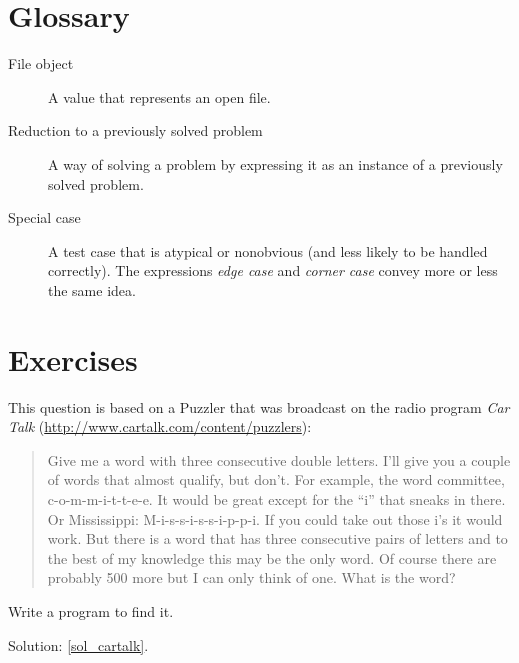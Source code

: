 \section{Glossary}

\begin{description}

\item[File object] A value that represents an open file.

\item[Reduction to a previously solved problem] A way of solving a
  problem by expressing it as an instance of a previously solved
  problem.

\item[Special case] A test case that is atypical or nonobvious
(and less likely to be handled correctly). The expressions   
\emph{edge case} and \emph{corner case} convey more or less 
the same idea.

\end{description}


\section{Exercises}

\begin{exercise}
\label{cartalk}

This question is based on a Puzzler that was broadcast on the radio
program {\em Car Talk} 
(\url{http://www.cartalk.com/content/puzzlers}):

\begin{quote}
Give me a word with three consecutive double letters. I'll give you a
couple of words that almost qualify, but don't. For example, the word
committee, c-o-m-m-i-t-t-e-e. It would be great except for the ``i'' that
sneaks in there. Or Mississippi: M-i-s-s-i-s-s-i-p-p-i. If you could
take out those i's it would work. But there is a word that has three
consecutive pairs of letters and to the best of my knowledge this may
be the only word. Of course there are probably 500 more but I can only
think of one. What is the word?
\end{quote}

Write a program to find it.

Solution: \ref{sol_cartalk}.

\end{exercise}


